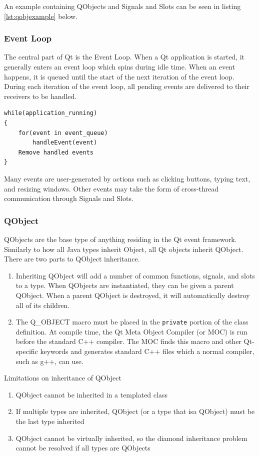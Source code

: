 	An example containing QObjects and Signals and Slots can be seen in listing \ref{lst:qobjexample} below.
	
\subsubsection*{Event Loop}
	The central part of Qt is the Event Loop. When a Qt application is started, it generally enters an event loop which spins during idle time. When an event happens, it is queued until the start of the next iteration of the event loop. During each iteration of the event loop, all pending events are delivered to their receivers to be handled.
	
	\begin{lstlisting}[caption={Pseudocode for the Qt Event Loop}]
while(application_running)
{
	for(event in event_queue)
		handleEvent(event)
	Remove handled events
}
	\end{lstlisting}
	
	Many events are user-generated by actions such as clicking buttons, typing text, and resizing windows. Other events may take the form of cross-thread communication through Signals and Slots.
	
\subsubsection*{QObject}
	QObjects are the base type of anything residing in the Qt event framework. Similarly to how all Java types inherit Object, all Qt objects inherit QObject. There are two parts to QObject inheritance.
	\begin{enumerate}
		\item Inheriting QObject will add a number of common functions, signals, and slots to a type. When QObjects are instantiated, they can be given a parent QObject. When a parent QObject is destroyed, it will automatically destroy all of its children.
		\item The Q\_OBJECT macro must be placed in the \lstinline|private| portion of the class definition. At compile time, the Qt Meta Object Compiler (or MOC) is run before the standard C++ compiler. The MOC finds this macro and other Qt-specific keywords and generates standard C++ files which a normal compiler, such as g++, can use.
	\end{enumerate}
	
	Limitations on inheritance of QObject
\begin{enumerate}
	\item QObject cannot be inherited in a templated class
	\item If multiple types are inherited, QObject (or a type that isa QObject) must be the last type inherited
	\item QObject cannot be virtually inherited, so the diamond inheritance problem cannot be resolved if all types are QObjects
\end{enumerate}
	
